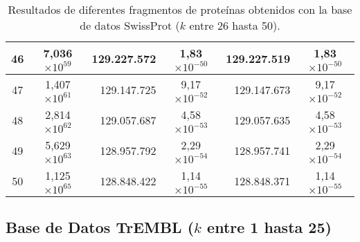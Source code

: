 \begin{table}[!hbt]
\begin{tabular}{| c  r  r  c  r  c |}
    46 & \multicolumn{1}{c}{7,036$\times 10^{59}$} & 129.227.572 & 1,83$\times 10^{-50}$ & 129.227.519 & 1,83$\times 10^{-50}$ \\ \hline  
    47 & \multicolumn{1}{c}{1,407$\times 10^{61}$} & 129.147.725 & 9,17$\times 10^{-52}$ & 129.147.673 & 9,17$\times 10^{-52}$ \\ \hline
    48 & \multicolumn{1}{c}{2,814$\times 10^{62}$} & 129.057.687 & 4,58$\times 10^{-53}$ & 129.057.635 & 4,58$\times 10^{-53}$ \\ \hline  
    49 & \multicolumn{1}{c}{5,629$\times 10^{63}$} & 128.957.792 & 2,29$\times 10^{-54}$ & 128.957.741 & 2,29$\times 10^{-54}$ \\ \hline
    50 & \multicolumn{1}{c}{1,125$\times 10^{65}$} & 128.848.422 & 1,14$\times 10^{-55}$ & 128.848.371 & 1,14$\times 10^{-55}$ \\ \hline       
    \end{tabular}
    \caption{Resultados de diferentes fragmentos de proteínas obtenidos con la base de datos SwissProt ($k$ entre 26 hasta 50).}
    \label{tb:labela12}
\end{table}

\newpage

\subsection*{Base de Datos TrEMBL ($k$ entre 1 hasta 25)}

